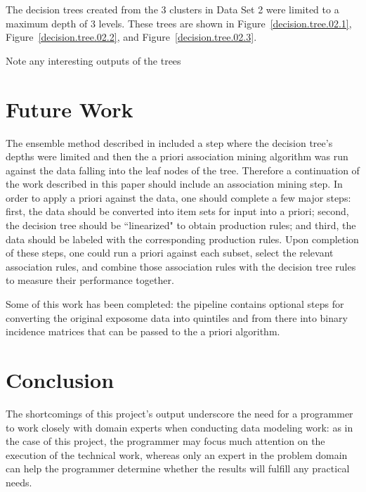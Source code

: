 \documentclass[conference,compsoc]{IEEEtran}
\begin{document}
The decision trees created from the 3 clusters in Data Set 2 were limited to a maximum depth of 3 levels. These trees are shown in 
Figure~\ref{decision.tree.02.1}, Figure~\ref{decision.tree.02.2}, and Figure~\ref{decision.tree.02.3}.

Note any interesting outputs of the trees

\section{Future Work}

The ensemble method described in \cite{datta} included a step where the decision tree's depths were limited and then the a priori association mining algorithm
was run against the data falling into the leaf nodes of the tree. Therefore a continuation of the work described in this paper should include an association
mining step. In order to apply a priori against the data, one should complete a few major steps: first, the data should be converted into item sets for 
input into a priori; second, the decision tree should be ``linearized" \cite{quinlan} to obtain production rules; and third, the data should be labeled with 
the corresponding production rules. Upon completion of these steps, one could run a priori against each subset, select the relevant association rules, and
combine those association rules with the decision tree rules to measure their performance together.

Some of this work has been completed: the pipeline contains optional steps for converting the original exposome data into quintiles and from there
into binary incidence matrices that can be passed to the a priori algorithm.

\section{Conclusion}

The shortcomings of this project's output underscore the need for a programmer to work closely with domain experts when conducting data modeling work:
as in the case of this project, the programmer may focus much attention on the execution of the technical work, whereas only an expert in the
problem domain can help the programmer determine whether the results will fulfill any practical needs.

\end{document}
